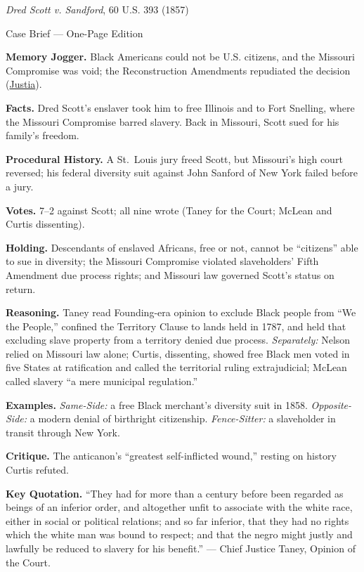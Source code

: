 \documentclass[12pt]{article}
\begin{document}
\begin{center}
{\Large \textit{Dred Scott v. Sandford}, 60 U.S. 393 (1857)\par}
\vspace{0.3em}
{\normalsize Case Brief --- One-Page Edition\par}
\end{center}

\textbf{Memory Jogger.} Black Americans could not be U.S. citizens, and the Missouri Compromise was void; the Reconstruction Amendments repudiated the decision (\href{https://supreme.justia.com/cases/federal/us/60/393/}{Justia}).

\textbf{Facts.} Dred Scott's enslaver took him to free Illinois and to Fort Snelling, where the Missouri Compromise barred slavery. Back in Missouri, Scott sued for his family's freedom.

\textbf{Procedural History.} A St.\ Louis jury freed Scott, but Missouri's high court reversed; his federal diversity suit against John Sanford of New York failed before a jury.

\textbf{Votes.} 7--2 against Scott; all nine wrote (Taney for the Court; McLean and Curtis dissenting).

\textbf{Holding.} Descendants of enslaved Africans, free or not, cannot be ``citizens'' able to sue in diversity; the Missouri Compromise violated slaveholders' Fifth Amendment due process rights; and Missouri law governed Scott's status on return.

\textbf{Reasoning.} Taney read Founding-era opinion to exclude Black people from ``We the People,'' confined the Territory Clause to lands held in 1787, and held that excluding slave property from a territory denied due process. \emph{Separately:} Nelson relied on Missouri law alone; Curtis, dissenting, showed free Black men voted in five States at ratification and called the territorial ruling extrajudicial; McLean called slavery ``a mere municipal regulation.''

\textbf{Examples.} \emph{Same-Side:} a free Black merchant's diversity suit in 1858. \emph{Opposite-Side:} a modern denial of birthright citizenship. \emph{Fence-Sitter:} a slaveholder in transit through New York.

\textbf{Critique.} The anticanon's ``greatest self-inflicted wound,'' resting on history Curtis refuted.

\textbf{Key Quotation.} ``They had for more than a century before been regarded as beings of an inferior order, and altogether unfit to associate with the white race, either in social or political relations; and so far inferior, that they had no rights which the white man was bound to respect; and that the negro might justly and lawfully be reduced to slavery for his benefit.'' --- Chief Justice Taney, Opinion of the Court.
\end{document}
